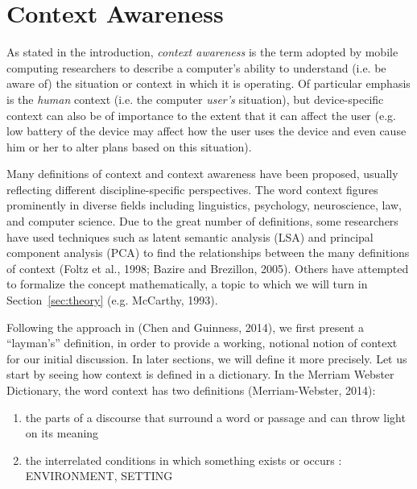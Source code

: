 \chapter{Context Awareness}
\label{ch:context_awareness}

As stated in the introduction, \emph{context awareness} is the term adopted by mobile computing researchers to describe a computer's ability to understand (i.e. be aware of) the situation or context in which it is operating. Of particular emphasis is the \emph{human} context (i.e. the computer \emph{user's} situation), but device-specific context can also be of importance to the extent that it can affect the user (e.g. low battery of the device may affect how the user uses the device and even cause him or her to alter plans based on this situation).

Many definitions of context and context awareness have been proposed, usually reflecting different discipline-specific perspectives. The word context figures prominently in diverse fields including linguistics, psychology, neuroscience, law, and computer science. Due to the great number of definitions, some researchers have used techniques such as latent semantic analysis (LSA) and principal component analysis (PCA) to find the relationships between the many definitions of context (Foltz et al., 1998; Bazire and Brezillon, 2005). Others have attempted to formalize the concept mathematically, a topic to which we will turn in Section~\ref{sec:theory} (e.g. McCarthy, 1993).

Following the approach in (Chen and Guinness, 2014), we first present a ``layman's'' definition, in order to provide a working, notional notion of context for our initial discussion. In later sections, we will define it more precisely. Let us start by seeing how context is defined in a dictionary. In the Merriam Webster Dictionary, the word context has two definitions (Merriam-Webster, 2014):

\begin{enumerate}
  \item the parts of a discourse that surround a word or passage and can throw light on its meaning
  \item the interrelated conditions in which something exists or occurs : ENVIRONMENT, SETTING
\end{enumerate}

